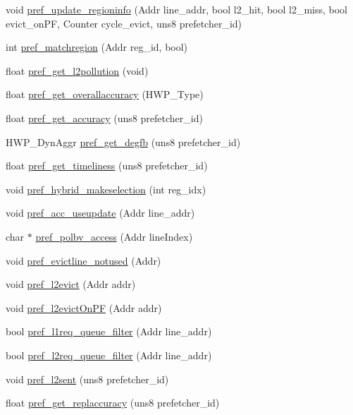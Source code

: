 \begin{DoxyCompactItemize}
\item 
void \hyperlink{classhwp__common__c_a6e2d87705fd706550b8208305601cb8c}{pref\_\-update\_\-regioninfo} (Addr line\_\-addr, bool l2\_\-hit, bool l2\_\-miss, bool evict\_\-onPF, Counter cycle\_\-evict, uns8 prefetcher\_\-id)
\item 
int \hyperlink{classhwp__common__c_a2bd5114855db1eb4cba1d1a810106ec6}{pref\_\-matchregion} (Addr reg\_\-id, bool)
\item 
float \hyperlink{classhwp__common__c_a2ee8cd5692a1a56cc823e6b3cd638951}{pref\_\-get\_\-l2pollution} (void)
\item 
float \hyperlink{classhwp__common__c_ab005210e7c29917252eec3ae1fa124e5}{pref\_\-get\_\-overallaccuracy} (HWP\_\-Type)
\item 
float \hyperlink{classhwp__common__c_a2162083052af8a3c87f7581255e4b5c4}{pref\_\-get\_\-accuracy} (uns8 prefetcher\_\-id)
\item 
HWP\_\-DynAggr \hyperlink{classhwp__common__c_a7f9662d82053ff6903468027a52cc90e}{pref\_\-get\_\-degfb} (uns8 prefetcher\_\-id)
\item 
float \hyperlink{classhwp__common__c_af7811d5a01ac7871befa7981524b0362}{pref\_\-get\_\-timeliness} (uns8 prefetcher\_\-id)
\item 
void \hyperlink{classhwp__common__c_af78a30a5e602bdb2cce4aa12a73ff03a}{pref\_\-hybrid\_\-makeselection} (int reg\_\-idx)
\item 
void \hyperlink{classhwp__common__c_a1425babdd9b5225b6ceadd8ded18a7fd}{pref\_\-acc\_\-useupdate} (Addr line\_\-addr)
\item 
char $\ast$ \hyperlink{classhwp__common__c_aa1c7c36423043a58393954abde7e2e1f}{pref\_\-polbv\_\-access} (Addr lineIndex)
\item 
void \hyperlink{classhwp__common__c_ab8f1300e4f7d754ae3af951fd563d5e8}{pref\_\-evictline\_\-notused} (Addr)
\item 
void \hyperlink{classhwp__common__c_aaf17cdc460f813ac8a0318289236a685}{pref\_\-l2evict} (Addr addr)
\item 
void \hyperlink{classhwp__common__c_ab7a365d3a9305263428cef111abdb41b}{pref\_\-l2evictOnPF} (Addr addr)
\item 
bool \hyperlink{classhwp__common__c_ab07a16a59c39a0e33575b2de65070441}{pref\_\-l1req\_\-queue\_\-filter} (Addr line\_\-addr)
\item 
bool \hyperlink{classhwp__common__c_a9f3a3c01f553a29e3f2a29efd71c585c}{pref\_\-l2req\_\-queue\_\-filter} (Addr line\_\-addr)
\item 
void \hyperlink{classhwp__common__c_afdb7761f89fe3c01feb90dbb88c0573b}{pref\_\-l2sent} (uns8 prefetcher\_\-id)
\item 
float \hyperlink{classhwp__common__c_afe333d0c12e7e5ccb341ec3cd5bb3c46}{pref\_\-get\_\-replaccuracy} (uns8 prefetcher\_\-id)
\end{DoxyCompactItemize}
